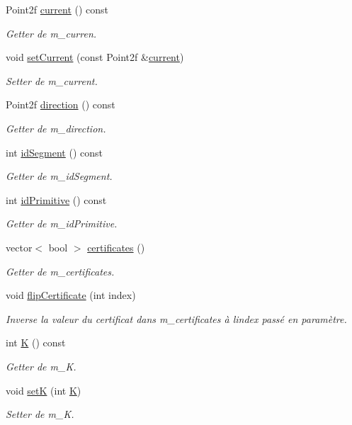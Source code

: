 \begin{DoxyCompactItemize}
Point2f \hyperlink{classPrimitive_a4abb7b712bb47b8862802ea35036ad2a}{current} () const
\begin{DoxyCompactList}\small\item\em Getter de m\+\_\+curren. \end{DoxyCompactList}\item 
void \hyperlink{classPrimitive_a658fc13a5d4a524019eab364632bf420}{set\+Current} (const Point2f \&\hyperlink{classPrimitive_a4abb7b712bb47b8862802ea35036ad2a}{current})
\begin{DoxyCompactList}\small\item\em Setter de m\+\_\+current. \end{DoxyCompactList}\item 
Point2f \hyperlink{classPrimitive_a3b5bb082b6f0358c4b5cd1333e9c359d}{direction} () const
\begin{DoxyCompactList}\small\item\em Getter de m\+\_\+direction. \end{DoxyCompactList}\item 
int \hyperlink{classPrimitive_a42806c3e24a4f0e06688ee38cbfdc8e7}{id\+Segment} () const
\begin{DoxyCompactList}\small\item\em Getter de m\+\_\+id\+Segment. \end{DoxyCompactList}\item 
int \hyperlink{classPrimitive_a7e4c88deefa351711897d2522333c530}{id\+Primitive} () const
\begin{DoxyCompactList}\small\item\em Getter de m\+\_\+id\+Primitive. \end{DoxyCompactList}\item 
vector$<$ bool $>$ \hyperlink{classPrimitive_aec6c5596a62aa29b559d3f7090ccdde0}{certificates} ()
\begin{DoxyCompactList}\small\item\em Getter de m\+\_\+certificates. \end{DoxyCompactList}\item 
void \hyperlink{classPrimitive_ac488e2f817127865f9bb8c0563012f43}{flip\+Certificate} (int index)
\begin{DoxyCompactList}\small\item\em Inverse la valeur du certificat dans m\+\_\+certificates à l\textquotesingle{}index passé en paramètre. \end{DoxyCompactList}\item 
int \hyperlink{classPrimitive_a1a78dc24085b7a840f22dd66a981530b}{K} () const
\begin{DoxyCompactList}\small\item\em Getter de m\+\_\+K. \end{DoxyCompactList}\item 
void \hyperlink{classPrimitive_adca41b714ede708b2bddcaca1bc8bc25}{setK} (int \hyperlink{classPrimitive_a1a78dc24085b7a840f22dd66a981530b}{K})
\begin{DoxyCompactList}\small\item\em Setter de m\+\_\+K. \end{DoxyCompactList}\end{DoxyCompactItemize}

